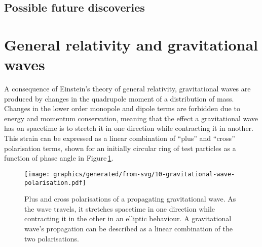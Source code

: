 \subsection{Possible future discoveries}

\section{General relativity and gravitational waves}
A consequence of Einstein's theory of general relativity, gravitational waves are produced by changes in the quadrupole moment of a distribution of mass. Changes in the lower order monopole and dipole terms are forbidden due to energy and momentum conservation, meaning that the effect a gravitational wave has on spacetime is to stretch it in one direction while contracting it in another. This strain can be expressed as a linear combination of ``plus'' and ``cross'' polarisation terms, shown for an initially circular ring of test particles as a function of phase angle in Figure\,\ref{fig:gravitational-wave-polarisation}.

\begin{figure}
  \centering
  \texttt{[image: graphics/generated/from-svg/10-gravitational-wave-polarisation.pdf]}
  \caption[Plus and cross polarisations of a propagating gravitational wave]{\label{fig:gravitational-wave-polarisation}Plus and cross polarisations of a propagating gravitational wave. As the wave travels, it stretches spacetime in one direction while contracting it in the other in an elliptic behaviour. A gravitational wave's propagation can be described as a linear combination of the two polarisations.}
\end{figure}


